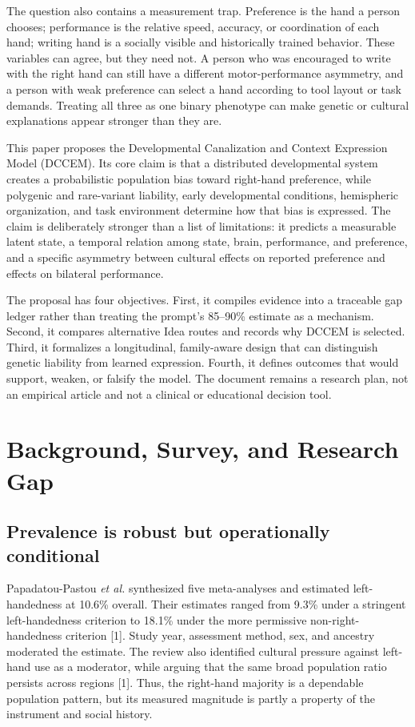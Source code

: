 \documentclass[10pt,conference]{IEEEtran}
\begin{document}
The question also contains a measurement trap. Preference is the hand a person chooses; performance is the relative speed, accuracy, or coordination of each hand; writing hand is a socially visible and historically trained behavior. These variables can agree, but they need not. A person who was encouraged to write with the right hand can still have a different motor-performance asymmetry, and a person with weak preference can select a hand according to tool layout or task demands. Treating all three as one binary phenotype can make genetic or cultural explanations appear stronger than they are.

This paper proposes the Developmental Canalization and Context Expression Model (DCCEM). Its core claim is that a distributed developmental system creates a probabilistic population bias toward right-hand preference, while polygenic and rare-variant liability, early developmental conditions, hemispheric organization, and task environment determine how that bias is expressed. The claim is deliberately stronger than a list of limitations: it predicts a measurable latent state, a temporal relation among state, brain, performance, and preference, and a specific asymmetry between cultural effects on reported preference and effects on bilateral performance.

The proposal has four objectives. First, it compiles evidence into a traceable gap ledger rather than treating the prompt's 85--90\% estimate as a mechanism. Second, it compares alternative Idea routes and records why DCCEM is selected. Third, it formalizes a longitudinal, family-aware design that can distinguish genetic liability from learned expression. Fourth, it defines outcomes that would support, weaken, or falsify the model. The document remains a research plan, not an empirical article and not a clinical or educational decision tool.

\section{Background, Survey, and Research Gap}
\subsection{Prevalence is robust but operationally conditional}
Papadatou-Pastou \textit{et al.} synthesized five meta-analyses and estimated left-handedness at 10.6\% overall. Their estimates ranged from 9.3\% under a stringent left-handedness criterion to 18.1\% under the more permissive non-right-handedness criterion [1]. Study year, assessment method, sex, and ancestry moderated the estimate. The review also identified cultural pressure against left-hand use as a moderator, while arguing that the same broad population ratio persists across regions [1]. Thus, the right-hand majority is a dependable population pattern, but its measured magnitude is partly a property of the instrument and social history.
\end{document}
